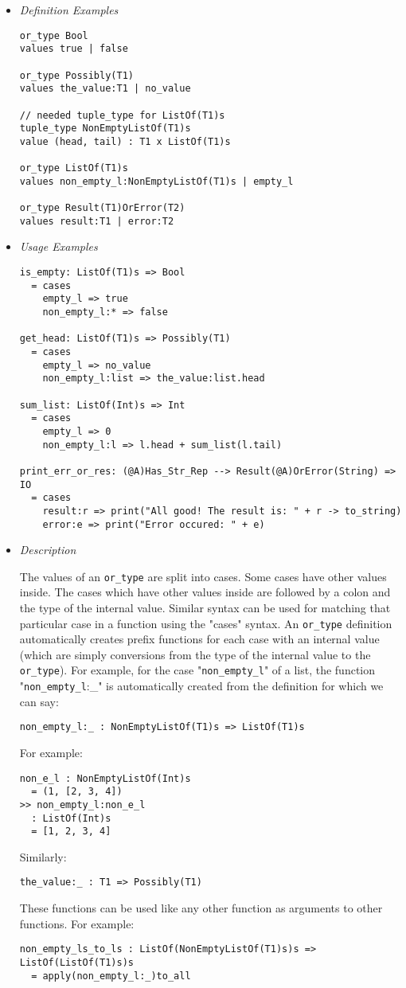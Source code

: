 \documentclass{article}
\begin{document}
\begin{itemize}
\item \textit{Definition Examples}

\begin{verbatim}
or_type Bool
values true | false

or_type Possibly(T1)
values the_value:T1 | no_value

// needed tuple_type for ListOf(T1)s
tuple_type NonEmptyListOf(T1)s
value (head, tail) : T1 x ListOf(T1)s

or_type ListOf(T1)s
values non_empty_l:NonEmptyListOf(T1)s | empty_l

or_type Result(T1)OrError(T2)
values result:T1 | error:T2
\end{verbatim}

\item \textit{Usage Examples}

\begin{verbatim}
is_empty: ListOf(T1)s => Bool
  = cases
    empty_l => true
    non_empty_l:* => false

get_head: ListOf(T1)s => Possibly(T1)
  = cases
    empty_l => no_value
    non_empty_l:list => the_value:list.head

sum_list: ListOf(Int)s => Int
  = cases
    empty_l => 0
    non_empty_l:l => l.head + sum_list(l.tail)

print_err_or_res: (@A)Has_Str_Rep --> Result(@A)OrError(String) => IO
  = cases
    result:r => print("All good! The result is: " + r -> to_string)
    error:e => print("Error occured: " + e)
\end{verbatim}

\item \textit{Description}

The values of an \texttt{or_type} are split into cases. Some cases have other
values inside.  The cases which have other values inside are followed by a
colon and the type of the internal value. Similar syntax can be used for
matching that particular case in a function using the "cases" syntax.  An
\texttt{or_type} definition automatically creates prefix functions for each
case with an internal value (which are simply conversions from the type of the
internal value to the \texttt{or_type}).  For example, for the case
"\texttt{non_empty_l}" of a list, the function "\texttt{non_empty_l}:_" is
automatically created from the definition for which we can say:
\begin{verbatim}
non_empty_l:_ : NonEmptyListOf(T1)s => ListOf(T1)s
\end{verbatim}
For example:
\begin{verbatim}
non_e_l : NonEmptyListOf(Int)s
  = (1, [2, 3, 4])
>> non_empty_l:non_e_l
  : ListOf(Int)s
  = [1, 2, 3, 4]
\end{verbatim}
Similarly:
\begin{verbatim}
the_value:_ : T1 => Possibly(T1)
\end{verbatim}
These functions can be used like any other function as arguments to other functions.
For example:
\begin{verbatim}
non_empty_ls_to_ls : ListOf(NonEmptyListOf(T1)s)s => ListOf(ListOf(T1)s)s
  = apply(non_empty_l:_)to_all
\end{verbatim}


\end{itemize}
\end{document}
